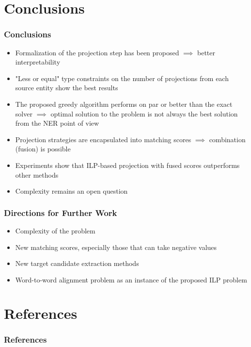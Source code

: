 \documentclass{beamer}
\begin{document}
\section{Conclusions}

\begin{frame}
  \frametitle{Conclusions}

  \begin{itemize}[<+->]
    \item Formalization of the projection step has been proposed \( \implies \) better interpretability
    \item "Less or equal" type constraints on the number of projections from each source entity show the best results
    \item The proposed greedy algorithm performs on par or better than the exact solver \( \implies \) optimal solution to the problem is not always the best solution from the NER point of view
    \item Projection strategies are encapsulated into matching scores \( \implies \)  combination (fusion) is possible
    \item Experiments show that ILP-based projection with fused scores outperforms other methods
    \item Complexity remains an open question
  \end{itemize}
\end{frame}

\begin{frame}
  \frametitle{Directions for Further Work}

  \begin{itemize}
    \item Complexity of the problem
    \item New matching scores, especially those that can take negative values
    \item New target candidate extraction methods
    \item Word-to-word alignment problem as an instance of the proposed ILP problem
  \end{itemize}
\end{frame}

\section*{References}

\begin{frame}[allowframebreaks]
  \frametitle{References}

  
  
\end{frame}
\end{document}
